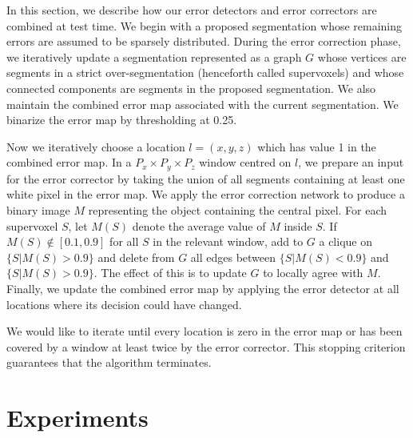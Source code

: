 \documentclass{article}
\begin{document}
In this section, we describe how our error detectors and error correctors are combined at test time. We begin with a proposed segmentation whose remaining errors are assumed to be sparsely distributed. During the error correction phase, we iteratively update a segmentation represented as a graph $G$ whose vertices are segments in a strict over-segmentation (henceforth called supervoxels) and whose connected components are segments in the proposed segmentation. We also maintain the combined error map associated with the current segmentation. We binarize the error map by thresholding at 0.25.

Now we iteratively choose a location $l=(x,y,z)$ which has value 1 in the combined error map. In a $P_x \times P_y \times P_z$ window centred on $l$, we prepare an input for the error corrector by taking the union of all segments containing at least one white pixel in the error map. We apply the error correction network to produce a binary image $M$ representing the object containing the central pixel. For each supervoxel $S$, let $M(S)$ denote the average value of $M$ inside $S$. If $M(S) \not \in [0.1,0.9]$ for all $S$ in the relevant window, add to $G$ a clique on $\{S | M(S) > 0.9\}$ and delete from $G$ all edges between $\{S | M(S) < 0.9\}$ and $\{S | M(S) > 0.9\}$. The effect of this is to update $G$ to locally agree with $M$. Finally, we update the combined error map by applying the error detector at all locations where its decision could have changed.

We would like to iterate until every location is zero in the error map or has been covered by a window at least twice by the error corrector. This stopping criterion guarantees that the algorithm terminates.



\section{Experiments}
\end{document}
